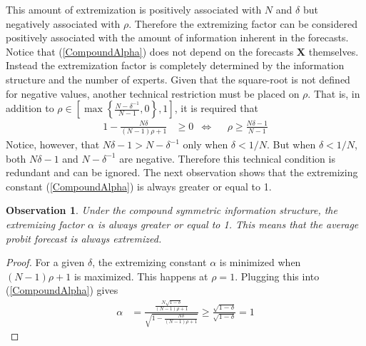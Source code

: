 \documentclass[11pt,twoside]{article}
\newtheorem{observation}[theorem]{Observation}
\theoremstyle{definition}
\theoremstyle{definition}
\begin{document}
This amount of extremization is positively associated with $N$ and $\delta$ but negatively associated with $\rho$. Therefore the extremizing factor can be considered positively associated with the amount of information inherent in the forecasts. Notice that (\ref{CompoundAlpha}) does not depend on the forecasts $\boldsymbol{X}$ themselves. Instead  the extremization factor is completely determined by the information structure and the number of experts. Given that the square-root is not defined for negative values, another technical restriction must be placed on $\rho$. That is, in addition to $\rho \in \left[  \max \left\{ \frac{N-\delta^{-1}}{N-1}, 0\right\}, 1 \right]$, it is required that
\begin{align*}
1- \frac{N\delta}{(N-1)\rho +1}  &\geq 0 &\Leftrightarrow&& \rho \geq \frac{N\delta - 1}{N-1}
\end{align*}
Notice, however, that $N\delta - 1 > N - \delta^{-1}$ only when $\delta < 1/N$. But when $\delta < 1/N$, both $N\delta - 1$ and $N - \delta^{-1}$ are negative. Therefore this technical condition is redundant and can be ignored. The next observation shows that the extremizing constant  (\ref{CompoundAlpha}) is always greater or equal to 1.  

\begin{observation}
\label{positiveThm}
Under the compound symmetric information structure, the extremizing factor $\alpha$ is always greater or equal to 1. This means that the average probit forecast is always extremized. 
\end{observation}
\begin{proof} 
For a given $\delta$, the extremizing constant $\alpha$ is minimized when $(N-1)\rho +1$ is maximized. This happens at $\rho = 1$. Plugging this into (\ref{CompoundAlpha}) gives
\begin{align*}
\alpha &= \frac{\frac{N\sqrt{1-\delta}}{(N-1)\rho +1}}{\sqrt{1- \frac{N\delta}{(N-1)\rho +1} }}  \geq \frac{\sqrt{1-\delta}}{\sqrt{1-\delta }} = 1
\end{align*}
\end{proof}
\end{document}

